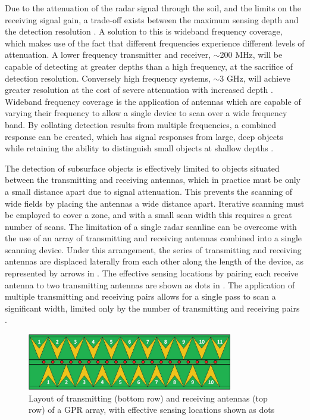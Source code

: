 \documentclass[main.tex]{subfiles}
\begin{document}
Due to the attenuation of the radar signal through the soil, and the limits on the receiving signal gain, a trade-off exists between the maximum sensing depth and the detection resolution \parencite{Ho2008}. A solution to this is wideband frequency coverage, which makes use of the fact that different frequencies experience different levels of attenuation. A lower frequency transmitter and receiver, $\sim$200 MHz, will be capable of detecting at greater depths than a high frequency, at the sacrifice of detection resolution. Conversely high frequency systems, $\sim$3 GHz, will achieve greater resolution at the cost of severe attenuation with increased depth \parencite{shresta2003}. Wideband frequency coverage is the application of antennas which are capable of varying their frequency to allow a single device to scan over a wide frequency band. By collating detection results from multiple frequencies, a combined response can be created, which has signal responses from large, deep objects while retaining the ability to distinguish small objects at shallow depths \parencite{3dradarDXG}.

The detection of subsurface objects is effectively limited to objects situated between the transmitting and receiving antennas, which in practice must be only a small distance apart due to signal attenuation. This prevents the scanning of wide fields by placing the antennas a wide distance apart. Iterative scanning must be employed to cover a zone, and with a small scan width this requires a great number of scans. The limitation of a single radar scanline can be overcome with the use of an array of transmitting and receiving antennas combined into a single scanning device. Under this arrangement, the series of transmitting and receiving antennas are displaced laterally from each other along the length of the device, as represented by arrows in . The effective sensing locations by pairing each receive antenna to two transmitting antennas are shown as dots in . The application of multiple transmitting and receiving pairs allows for a single pass to scan a significant width, limited only by the number of transmitting and receiving pairs \parencite{3dradarDX}. 
\begin{figure}[ht]
\centering
\includegraphics[width=0.8\textwidth]{2-LiteratureReview/3d-radar.png}
\caption[Layout of transmitting and receiving antennas of a GPR array]{Layout of transmitting (bottom row) and receiving antennas (top row) of a GPR array, with effective sensing locations shown as dots \parencite{3dradarDXG}}
\end{figure}
\end{document}
